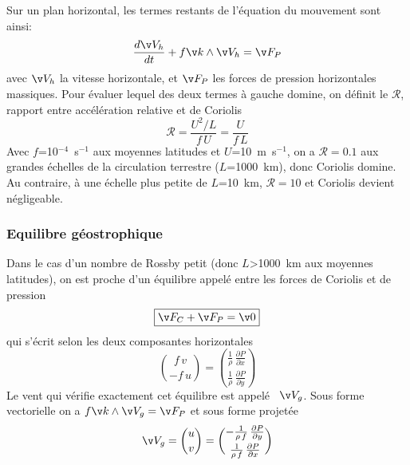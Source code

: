 \sk
Sur un plan horizontal, les termes restants de l'équation du mouvement sont ainsi:
\[  \frac{d\v V_h}{dt}+f\v k\wedge\v V_h=\v F_P  \]
avec $\v V_h$ la vitesse horizontale, et $\v F_P$ les forces de pression horizontales massiques. Pour évaluer lequel des deux termes à gauche domine, on définit le  $\mathcal{R}$, rapport entre accélération relative et de Coriolis
\[ \mathcal{R} = \frac{U^2/L}{f\,U} = \frac{U}{f\,L} \]
Avec $f$=10$^{-4}$~s$^{-1}$ aux moyennes latitudes et $U$=10~m~s$^{-1}$, on a $\mathcal{R}=0.1$ aux grandes échelles de la circulation terrestre ($L$=1000~km), donc Coriolis domine. Au contraire, à une échelle plus petite de $L$=10~km, $\mathcal{R}=10$ et Coriolis devient négligeable.

\sk
\subsubsection{Equilibre géostrophique}

\sk
Dans le cas d'un nombre de Rossby petit (donc $L$>1000~km aux moyennes latitudes), on est proche d'un équilibre appelé  entre les forces de Coriolis et de pression
\[ \boxed{ \v F_C+\v F_P=\v 0 } \]
qui s'écrit selon les deux composantes horizontales
\[ \boxed{ \binom{f \, v}{-f \, u} = \binom{\frac{1}{\rho} \,\frac{\partial P}{\partial x}}{\frac{1}{\rho} \,\frac{\partial P}{\partial y}} } \]
Le vent qui vérifie exactement cet équilibre est appelé ~$\v V_g$. Sous forme vectorielle on a $f\v k\wedge\v V_g=\v F_P$ et sous forme projetée
\[ \v V_g = \binom{u}{v} = \binom{- \frac{1}{\rho \, f} \, \frac{\partial P}{\partial y}}{\frac{1}{\rho \, f} \, \frac{\partial P}{\partial x}} \]


